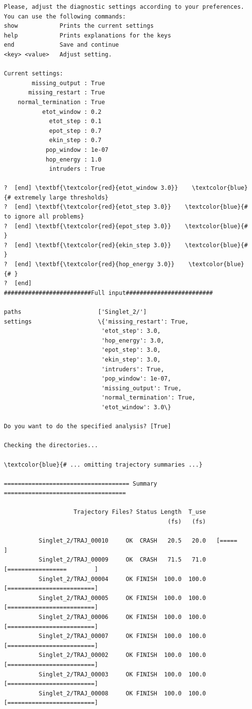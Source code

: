 \documentclass[a4paper,11pt,DIV=15,openany]{scrbook}
\begin{document}
\begin{oframed}
\begin{Verbatim}[commandchars=\\\{\}]
Please, adjust the diagnostic settings according to your preferences.
You can use the following commands:
show            Prints the current settings
help            Prints explanations for the keys
end             Save and continue
<key> <value>   Adjust setting.

Current settings:
        missing_output : True
       missing_restart : True
    normal_termination : True
           etot_window : 0.2
             etot_step : 0.1
             epot_step : 0.7
             ekin_step : 0.7
            pop_window : 1e-07
            hop_energy : 1.0
             intruders : True

?  [end] \textbf{\textcolor{red}{etot_window 3.0}}    \textcolor{blue}{# extremely large thresholds}
?  [end] \textbf{\textcolor{red}{etot_step 3.0}}    \textcolor{blue}{# to ignore all problems}
?  [end] \textbf{\textcolor{red}{epot_step 3.0}}    \textcolor{blue}{# }
?  [end] \textbf{\textcolor{red}{ekin_step 3.0}}    \textcolor{blue}{# }
?  [end] \textbf{\textcolor{red}{hop_energy 3.0}}    \textcolor{blue}{# }
?  [end] 
#########################Full input#########################

paths                      ['Singlet_2/']
settings                   \{'missing_restart': True, 
                            'etot_step': 3.0, 
                            'hop_energy': 3.0,
                            'epot_step': 3.0, 
                            'ekin_step': 3.0, 
                            'intruders': True,
                            'pop_window': 1e-07,
                            'missing_output': True, 
                            'normal_termination': True,
                            'etot_window': 3.0\}

Do you want to do the specified analysis? [True] 

Checking the directories...

\textcolor{blue}{# ... omitting trajectory summaries ...}

==================================== Summary ===================================

                    Trajectory Files? Status Length  T_use
                                               (fs)   (fs)

          Singlet_2/TRAJ_00010     OK  CRASH   20.5   20.0   [=====                    ]
          Singlet_2/TRAJ_00009     OK  CRASH   71.5   71.0   [=================        ]
          Singlet_2/TRAJ_00004     OK FINISH  100.0  100.0   [=========================]
          Singlet_2/TRAJ_00005     OK FINISH  100.0  100.0   [=========================]
          Singlet_2/TRAJ_00006     OK FINISH  100.0  100.0   [=========================]
          Singlet_2/TRAJ_00007     OK FINISH  100.0  100.0   [=========================]
          Singlet_2/TRAJ_00002     OK FINISH  100.0  100.0   [=========================]
          Singlet_2/TRAJ_00003     OK FINISH  100.0  100.0   [=========================]
          Singlet_2/TRAJ_00008     OK FINISH  100.0  100.0   [=========================]


\end{Verbatim}
\end{oframed}
\end{document}
